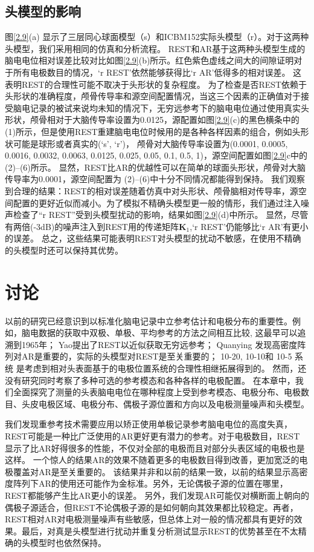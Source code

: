 \subsection{头模型的影响}
\label{ch:head-model-disturbance}
图\ref{2.9}(a) 显示了三层同心球面模型（s）和ICBM152实际头模型（r）。对于这两种头模型，我们采用相同的仿真和分析流程。 REST和AR基于这两种头模型生成的脑电电位相对误差比较对比如图\ref{2.9}(b)所示。红色紫色虚线之间大的间隙证明对于所有电极数目的情况，‘r REST’依然能够获得比‘r AR’低得多的相对误差。
这表明REST的合理性可能不取决于头形状的复杂程度。 为了检查是否REST依赖于头形状的准确程度，颅骨传导率和源空间配置情况，当这三个因素的正确值对于接受脑电记录的被试来说均未知的情况下，无穷远参考下的脑电电位通过使用真实头形状，颅骨相对于大脑传导率设置为0.0125，源配置如图\ref{2.9}(c)的黑色横条中的(1)所示，但是使用REST重建脑电电位时候用的是各种各样因素的组合，例如头形状可能是球形或者真实的(‘s’, ‘r’)， 颅骨对大脑传导率设置为(0.0001, 0.0005, 0.0016, 0.0032, 0.0063, 0.0125, 0.025, 0.05, 0.1, 0.5, 1)，源空间配置如图\ref{2.9}c中的(2)–(6)所示。 显然，REST比AR的优越性可以在简单的球面头形状，颅骨对大脑传导率为0.0001，源空间配置为 (2)–(6)中十分不同情况都能得到保持。 我们观察到合理的结果：REST的相对误差随着仿真中对头形状、颅骨脑相对传导率，源空间配置的更好近似而减小。为了模拟不精确头模型更一般的情形，我们通过注入噪声检查了“r REST”受到头模型扰动的影响，结果如图\ref{2.9}(d)中所示。 显然，尽管有两倍(-3dB)的噪声注入到REST用的传递矩阵$\mathbf{K}_1$,‘r
REST’仍能够比‘r AR’有更小的误差。 总之，这些结果可能表明REST对头模型的扰动不敏感，在使用不精确的头模型时还可以保持其优势。

\section{讨论}
以前的研究已经意识到以标准化脑电记录中立参考估计和电极分布的重要性。例如，脑电数据的获取中双极、单极、平均参考的方法之间相互比较, 这最早可以追溯到1965年； Yao提出了REST以近似获取无穷远参考； Quanying
发现高密度阵列对AR是重要的，实际的头模型对REST是至关重要的； 10-20, 10-10和 10-5 系统 是考虑到相对头表面基于的电极位置系统的合理性相继拓展得到的。 然而，还没有研究同时考察了多种可选的参考模态和各种各样的电极配置。 在本章中，我们全面探究了测量的头表脑电电位在哪种程度上受到参考模态、电极分布、电极数目、头皮电极区域、电极分布、偶极子源位置和方向以及电极测量噪声和头模型。

我们发现重参考技术需要应用以矫正使用单极记录参考脑电电位的高度失真，REST可能是一种比广泛使用的AR更好更有潜力的参考。对于电极数目，REST 显示了比AR好得很多的性能，不仅对全部的电极而且对部分头表区域的电极也是这样。 一个惊人的结果AR的效果不随着更多的电极数目得到改善，更加宽泛的电极覆盖对AR是至关重要的。 该结果并非和以前的结果一致，以前的结果显示高密度阵列下AR的使用还可能作为金标准。另外，无论偶极子源的位置在哪里，REST都能够产生比AR更小的误差。 另外，我们发现AR可能仅对横断面上朝向的偶极子源适合，但REST不论偶极子源的是如何朝向其效果都比较稳定。再者，REST相对AR对电极测量噪声有些敏感，但总体上对一般的情况都具有更好的效果。最后，对真是头模型进行扰动并重复分析测试显示REST的优势甚至在不太精确的头模型时也依然保持。

